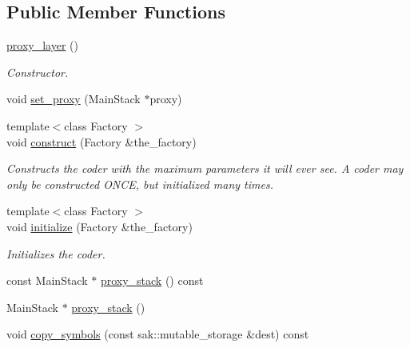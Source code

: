 \subsection*{Public Member Functions}
\begin{DoxyCompactItemize}
\item 
\hypertarget{classkodo_1_1proxy__layer_aee161a1d316785af8d009fab7528711a}{\hyperlink{classkodo_1_1proxy__layer_aee161a1d316785af8d009fab7528711a}{proxy\-\_\-layer} ()}\label{classkodo_1_1proxy__layer_aee161a1d316785af8d009fab7528711a}

\begin{DoxyCompactList}\small\item\em Constructor. \end{DoxyCompactList}\item 
void \hyperlink{classkodo_1_1proxy__layer_a4ff7feb88d0b178b1543419751236f22}{set\-\_\-proxy} (Main\-Stack $\ast$proxy)
\item 
{\footnotesize template$<$class Factory $>$ }\\void \hyperlink{classkodo_1_1proxy__layer_a649678b45b1cec8604ad81b491a70ad7}{construct} (Factory \&the\-\_\-factory)
\begin{DoxyCompactList}\small\item\em Constructs the coder with the maximum parameters it will ever see. A coder may only be constructed O\-N\-C\-E, but initialized many times. \end{DoxyCompactList}\item 
{\footnotesize template$<$class Factory $>$ }\\void \hyperlink{classkodo_1_1proxy__layer_a42022c708ffb3303c21a2a594cb25726}{initialize} (Factory \&the\-\_\-factory)
\begin{DoxyCompactList}\small\item\em Initializes the coder. \end{DoxyCompactList}\item 
const Main\-Stack $\ast$ \hyperlink{classkodo_1_1proxy__layer_a8b0a9a2f07dc67384fd0c35fee856ba6}{proxy\-\_\-stack} () const 
\item 
Main\-Stack $\ast$ \hyperlink{classkodo_1_1proxy__layer_ad0d3c4d957e4ad08ad68366952b1dd09}{proxy\-\_\-stack} ()
\item 
void \hyperlink{classkodo_1_1proxy__layer_a2e86248fb34d469dfe7dcaba5a7f1740}{copy\-\_\-symbols} (const sak\-::mutable\-\_\-storage \&dest) const 
\begin{DoxyCompactList}\small\item\em \end{DoxyCompactList}\item 

\end{DoxyCompactItemize}
